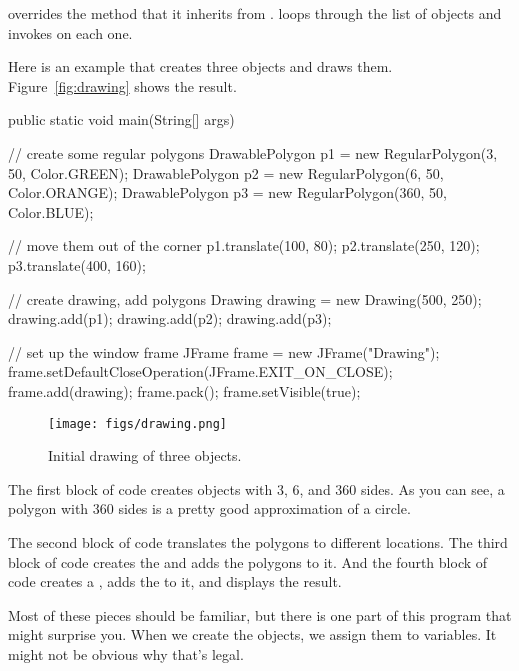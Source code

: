  overrides the  method that it inherits from .
 loops through the list of  objects and invokes  on each one.

Here is an example that creates three  objects and draws them.
Figure~\ref{fig:drawing} shows the result.

\begin{code}
public static void main(String[] args) {

    // create some regular polygons
    DrawablePolygon p1 = new RegularPolygon(3, 50, Color.GREEN);
    DrawablePolygon p2 = new RegularPolygon(6, 50, Color.ORANGE);
    DrawablePolygon p3 = new RegularPolygon(360, 50, Color.BLUE);

    // move them out of the corner
    p1.translate(100, 80);
    p2.translate(250, 120);
    p3.translate(400, 160);

    // create drawing, add polygons
    Drawing drawing = new Drawing(500, 250);
    drawing.add(p1);
    drawing.add(p2);
    drawing.add(p3);

    // set up the window frame
    JFrame frame = new JFrame("Drawing");
    frame.setDefaultCloseOperation(JFrame.EXIT_ON_CLOSE);
    frame.add(drawing);
    frame.pack();
    frame.setVisible(true);
}
\end{code}

\label{fig:drawing}
\begin{figure}[!ht]
\begin{center}
\texttt{[image: figs/drawing.png]}
\caption{Initial drawing of three  objects.}
\end{center}
\end{figure}


The first block of code creates  objects with 3, 6, and 360 sides.
As you can see, a polygon with 360 sides is a pretty good approximation of a circle.

The second block of code translates the polygons to different locations.
The third block of code creates the  and adds the polygons to it.
And the fourth block of code creates a , adds the  to it, and displays the result.

Most of these pieces should be familiar, but there is one part of this program that might surprise you.
When we create the  objects, we assign them to  variables.
It might not be obvious why that's legal.

